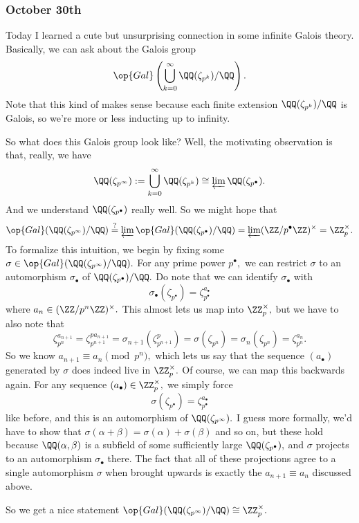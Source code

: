 \subsubsection{October 30th}
Today I learned a cute but unsurprising connection in some infinite Galois theory. Basically, we can ask about the Galois group
\[\op{Gal}\left(\bigcup_{k=0}^\infty\QQ(\zeta_{p^k})/\QQ\right).\]
Note that this kind of makes sense because each finite extension $\QQ(\zeta_{p^k})/\QQ$ is Galois, so we're more or less inducting up to infinity.

So what does this Galois group look like? Well, the motivating observation is that, really, we have
\[\QQ(\zeta_{p^\infty}):=\bigcup_{k=0}^\infty\QQ(\zeta_{p^k})\cong\varprojlim\QQ(\zeta_{p^\bullet}).\]
And we understand $\QQ(\zeta_{p^\bullet})$ really well. So we might hope that
\[\op{Gal}(\QQ(\zeta_{p^\infty})/\QQ)\stackrel?=\varprojlim\op{Gal}(\QQ(\zeta_{p^\bullet})/\QQ)=\varprojlim(\ZZ/p^\bullet\ZZ)^\times=\ZZ_p^\times.\]
To formalize this intuition, we begin by fixing some $\sigma\in\op{Gal}(\QQ(\zeta_{p^\infty})/\QQ).$ For any prime power $p^\bullet,$ we can restrict $\sigma$ to an automorphism $\sigma_\bullet$ of $\QQ(\zeta_{p^\bullet})/\QQ.$ Do note that we can identify $\sigma_\bullet$ with
\[\sigma_\bullet(\zeta_{p^\bullet})=\zeta_{p^\bullet}^{a_\bullet}\]
where $a_n\in(\ZZ/p^n\ZZ)^\times.$ This almost lets us map into $\ZZ_p^\times,$ but we have to also note that
\[\zeta_{p^n}^{a_{n+1}}=\zeta_{p^{n+1}}^{pa_{n+1}}=\sigma_{n+1}(\zeta_{p^{n+1}}^p)=\sigma(\zeta_{p^n})=\sigma_n(\zeta_{p^n})=\zeta_{p^n}^{a_n}.\]
So we know $a_{n+1}\equiv a_n\pmod{p^n},$ which lets us say that the sequence $(a_\bullet)$ generated by $\sigma$ does indeed live in $\ZZ_p^\times.$ Of course, we can map this backwards again. For any sequence $(a_\bullet)\in\ZZ_p^\times,$ we simply force
\[\sigma(\zeta_{p^\bullet})=\zeta_{p^\bullet}^{a_\bullet}\]
like before, and this is an automorphism of $\QQ(\zeta_{p^\infty}).$ I guess more formally, we'd have to show that $\sigma(\alpha+\beta)=\sigma(\alpha)+\sigma(\beta)$ and so on, but these hold because $\QQ(\alpha,\beta)$ is a subfield of some sufficiently large $\QQ(\zeta_{p^\bullet}),$ and $\sigma$ projects to an automorphism $\sigma_\bullet$ there. The fact that all of these projections agree to a single automorphism $\sigma$ when brought upwards is exactly the $a_{n+1}\equiv a_n$ discussed above.

So we get a nice statement $\op{Gal}(\QQ(\zeta_{p^\infty})/\QQ)\cong\ZZ_p^\times.$

